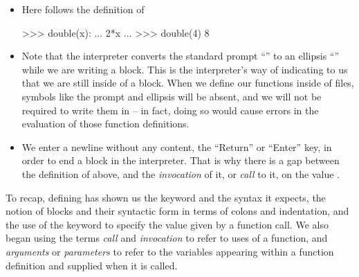 \begin{itemize}
\begin{itemize}
        \end{itemize}
    \item Here follows the definition of 
\begin{codeblock}
>>>  double(x):
...      2*x
...
>>> double(4)
8
\end{codeblock}
    \item Note that the interpreter converts the standard prompt ``\pyprompt'' to an ellipsis ``'' while we are writing a block.
        This is the interpreter's way of indicating to us that we are still inside of a block.
        When we define our functions inside of files, symbols like the prompt and ellipsis will be absent, and we will not be required to write them in -- in fact, doing so would cause errors in the evaluation of those function definitions.
    \item We enter a newline without any content, the ``Return'' or ``Enter'' key, in order to end a block in the interpreter.
        That is why there is a gap between the definition of  above, and the \emph{invocation} of it, or \emph{call} to it, on the value .
\end{itemize}

To recap, defining  has shown us the  keyword and the syntax it expects, the notion of blocks and their syntactic form in terms of colons and indentation, and the use of the  keyword to specify the value given by a function call.
We also began using the terms \emph{call} and \emph{invocation} to refer to uses of a function, and \emph{arguments} or \emph{parameters} to refer to the variables appearing within a function definition and supplied when it is called.

